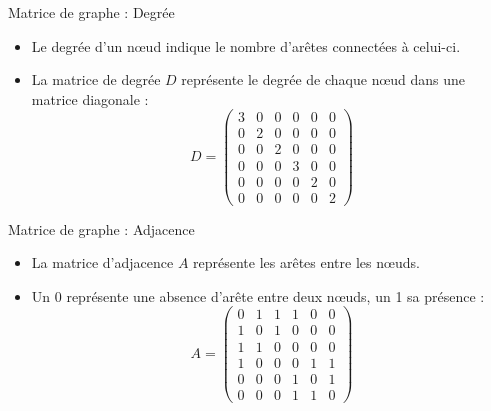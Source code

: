 \begin{frame}{Matrice de graphe : Degrée}
    \begin{minipage}{0.49\linewidth}
        \begin{itemize}
            \item Le \alert{degrée d'un nœud} indique le nombre d'arêtes connectées à celui-ci.
            \item La \alert{matrice de degrée} $D$ représente le degrée de chaque nœud dans une matrice diagonale :
            $$
            D = \begin{pmatrix}
                3 & 0 & 0 & 0 & 0 & 0\\
                0 & 2 & 0 & 0 & 0 & 0\\
                0 & 0 & 2 & 0 & 0 & 0\\
                0 & 0 & 0 & 3 & 0 & 0\\
                0 & 0 & 0 & 0 & 2 & 0\\
                0 & 0 & 0 & 0 & 0 & 2
            \end{pmatrix}
            $$
        \end{itemize}
    \end{minipage}
    \begin{minipage}{0.49\linewidth}
    \end{minipage}
\end{frame}

\begin{frame}{Matrice de graphe : Adjacence}
    \begin{minipage}{0.49\linewidth}
        \begin{itemize}
            \item La \alert{matrice d'adjacence} $A$ représente les arêtes entre les nœuds. 
            \item Un 0 représente une absence d'arête entre deux nœuds, un 1 sa présence :
            $$
            A = \begin{pmatrix}
                0 & 1 & 1 & 1 & 0 & 0\\
                1 & 0 & 1 & 0 & 0 & 0\\
                1 & 1 & 0 & 0 & 0 & 0\\
                1 & 0 & 0 & 0 & 1 & 1\\
                0 & 0 & 0 & 1 & 0 & 1\\
                0 & 0 & 0 & 1 & 1 & 0
            \end{pmatrix}
            $$
        \end{itemize}
    \end{minipage}
    \begin{minipage}{0.49\linewidth}
    \end{minipage}
\end{frame}

